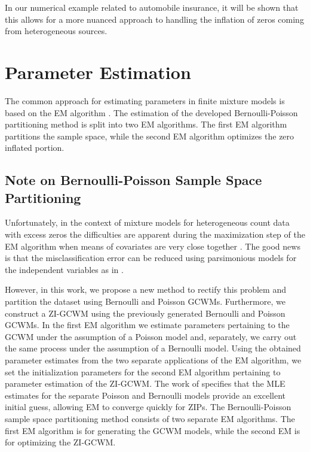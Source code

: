 \documentclass[12pt,letterpaper]{article}
\numberwithin{equation}{section}
\numberwithin{equation}{section}
\numberwithin{equation}{section}
\begin{document}
In our numerical example related to automobile insurance, it will be shown that this allows for a more nuanced approach to handling the inflation of zeros coming from heterogeneous sources. %


\section{Parameter Estimation}\label{sec:estmeth}

The common approach for estimating parameters in finite mixture models is based on the EM algorithm \citep[see][for examples]{mcnicholas16a}.
The estimation of the developed Bernoulli-Poisson partitioning method is split into two EM algorithms. The first EM algorithm partitions the sample space, while the second EM algorithm optimizes the zero inflated portion.

\subsection{Note on Bernoulli-Poisson Sample Space Partitioning}

Unfortunately, in the context of mixture models for heterogeneous count data with excess zeros the difficulties are apparent  during the maximization step of the EM algorithm when means of covariates are very close together \cite[see][]{LimHwa}. The good news is that the misclassification error can be reduced using parsimonious models for the independent variables as in  \cite{McNicholas:2010}. 

However, in this work, we propose a new method to rectify this problem and partition the dataset using Bernoulli and Poisson GCWMs. Furthermore, we construct a ZI-GCWM using the previously generated Bernoulli and Poisson GCWMs. In the first EM algorithm we estimate parameters pertaining to the GCWM under the assumption of a Poisson model and, separately, we carry out the same process under the assumption of a Bernoulli model. Using the obtained parameter estimates from the two separate applications of the EM algorithm, we set the initialization parameters for the second EM algorithm pertaining to parameter estimation of the ZI-GCWM. The work of \cite{Lambert} specifies that the MLE estimates for the separate Poisson and Bernoulli models provide an excellent initial guess, allowing EM to converge quickly for ZIPs. The Bernoulli-Poisson sample space partitioning method consists of two separate EM algorithms. The first EM algorithm is for generating the GCWM models, while the second EM is for optimizing the ZI-GCWM. 
\end{document}
